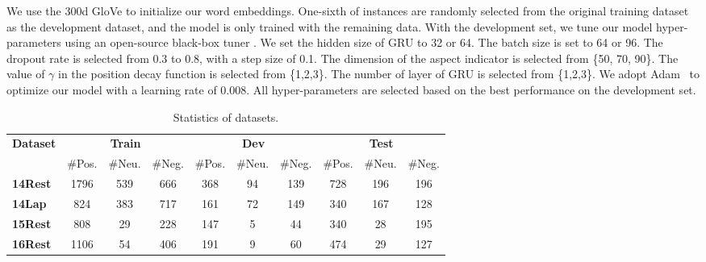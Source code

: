 \documentclass[11pt,a4paper]{article}
\begin{document}
We use the 300d GloVe \cite{pennington2014glove} to initialize our word embeddings.  One-sixth of instances are randomly selected from the original training dataset as the development dataset, and the model is only trained with the remaining data. With the development set, we tune our model hyper-parameters using an open-source black-box tuner \cite{alberto}. We set the hidden size of GRU to 32 or 64. The batch size is set to 64 or 96. The dropout rate is selected from 0.3 to 0.8, with a step size of 0.1. The dimension of the aspect indicator is selected from \{50, 70, 90\}. The value of $\gamma$ in the position decay function is selected from \{1,2,3\}. The number of layer of GRU is selected from \{1,2,3\}. We adopt Adam~\cite{kingma2014adam} to optimize our model with a learning rate of 0.008. All hyper-parameters are selected based on the best performance on the development set.
\begin{table}[t!]
\centering
\resizebox{\columnwidth}{!}
{\begin{tabular}{@{~}l@{~}c@{~}c@{~}c@{~}c@{~}c@{~}c@{~}c@{~}c@{~}c@{~}}
\toprule
 \multirow{2}{*}{\textbf{Dataset}}  & \multicolumn{3}{c}{\textbf{Train}}  & \multicolumn{3}{c}{\textbf{Dev}}  & \multicolumn{3}{c}{\textbf{Test}} \\ \cmidrule(lr){2-4}\cmidrule(lr){5-7} \cmidrule(lr){8-10}
& \#Pos. & \#Neu. & \#Neg. &  \#Pos. & \#Neu. & \#Neg. & \#Pos. & \#Neu. & \#Neg.  \\\hline 
\textbf{14Rest}  & 1796 & 539 & 666  & 368 & 94 & 139 & 728 & 196 & 196 \\
\textbf{14Lap}  &  824 & 383 & 717 &  161 & 72  & 149 & 340 & 167 & 128 \\
\textbf{15Rest} &  808 & 29 & 228 &  147 &5 & 44 &  340 & 28 & 195 \\
\textbf{16Rest} & 1106 & 54 & 406 &  191 & 9 & 60 & 474 & 29 & 127 \\



\bottomrule
\end{tabular}}
\caption{Statistics of datasets.  }
\label{tab:statistics}
\vspace{-2mm}
\end{table}
\end{document}
